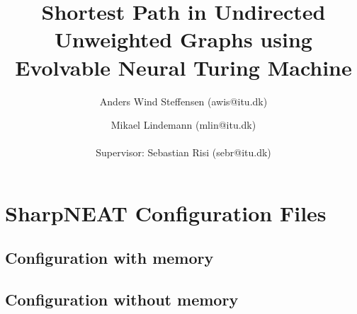 \documentclass{article}
\author{Anders Wind Steffensen (awis@itu.dk)\and Mikael Lindemann (mlin@itu.dk)\\\\Supervisor: Sebastian Risi (sebr@itu.dk)}
\title{Shortest Path in Undirected Unweighted Graphs using Evolvable Neural Turing Machine}
\begin{document}

\maketitle
\tableofcontents
\listoftodos
\newpage







\newpage


\newpage

\appendix
\section{SharpNEAT Configuration Files}
\label{appendix:sharpneat:configurations}
\subsection{Configuration with memory}


\subsection{Configuration without memory}

\end{document}
